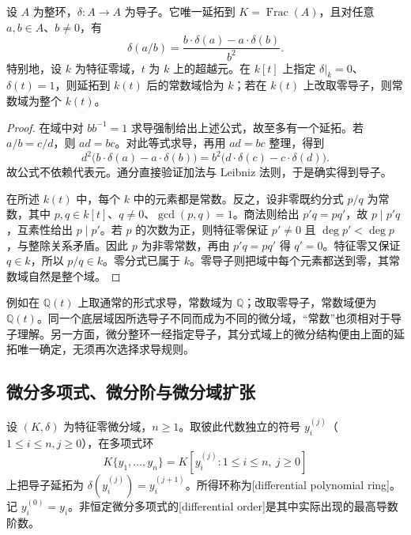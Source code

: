 \begin{proposition}\label{b3:prop:derivation-fraction-extension}\label{b3:prop:E-rational-constants}
	设 \(A\) 为整环，\(\delta:A\to A\) 为导子。它唯一延拓到 \(K=\operatorname{Frac}(A)\)，且对任意 \(a,b\in A\)、\(b\ne0\)，有
	\[
		\delta(a/b)=\frac{b\cdot\delta(a)-a\cdot\delta(b)}{b^2}.
	\]
	特别地，设 \(k\) 为特征零域，\(t\) 为 \(k\) 上的超越元。在 \(k[t]\) 上指定 \(\delta|_k=0\)、\(\delta(t)=1\)，则延拓到 \(k(t)\) 后的常数域恰为 \(k\)；若在 \(k(t)\) 上改取零导子，则常数域为整个 \(k(t)\)。
\end{proposition}
\begin{proof}
	在域中对 \(bb^{-1}=1\) 求导强制给出上述公式，故至多有一个延拓。若 \(a/b=c/d\)，则 \(ad=bc\)。对此等式求导，再用 \(ad=bc\) 整理，得到
	\[
		d^2\bigl(b\cdot\delta(a)-a\cdot\delta(b)\bigr) =b^2\bigl(d\cdot\delta(c)-c\cdot\delta(d)\bigr).
	\]
	故公式不依赖代表元。通分直接验证加法与 Leibniz 法则，于是确实得到导子。

	在所述 \(k(t)\) 中，每个 \(k\) 中的元素都是常数。反之，设非零既约分式 \(p/q\) 为常数，其中 \(p,q\in k[t]\)、\(q\ne0\)、\(\gcd(p,q)=1\)。商法则给出 \(p'q=pq'\)，故 \(p\mid p'q\)，互素性给出 \(p\mid p'\)。若 \(p\) 的次数为正，则特征零保证 \(p'\ne0\) 且 \(\deg p'<\deg p\)，与整除关系矛盾。因此 \(p\) 为非零常数，再由 \(p'q=pq'\) 得 \(q'=0\)。特征零又保证 \(q\in k\)，所以 \(p/q\in k\)。零分式已属于 \(k\)。零导子则把域中每个元素都送到零，其常数域自然是整个域。
\end{proof}

例如在 \(\mathbb Q(t)\) 上取通常的形式求导，常数域为 \(\mathbb Q\)；改取零导子，常数域便为 \(\mathbb Q(t)\)。同一个底层域因所选导子不同而成为不同的微分域，“常数”也须相对于导子理解。另一方面，微分整环一经指定导子，其分式域上的微分结构便由上面的延拓唯一确定，无须再次选择求导规则。

\subsection{微分多项式、微分阶与微分域扩张}
\label{b3:subsec:E01:02}

\begin{definition}\label{b3:def:differential-polynomial-ring}
	设 \((K,\delta)\) 为特征零微分域，\(n\ge1\)。取彼此代数独立的符号 \(y_i^{(j)}\)（\(1\le i\le n,j\ge0\)），在多项式环
	\[
		K\{y_1,\ldots,y_n\}=K[y_i^{(j)}:1\le i\le n,\ j\ge0]
	\]
	上把导子延拓为 \(\delta(y_i^{(j)})=y_i^{(j+1)}\)。所得环称为[differential polynomial ring]。记 \(y_i^{(0)}=y_i\)。非恒定微分多项式的[differential order]是其中实际出现的最高导数阶数。
\end{definition}

